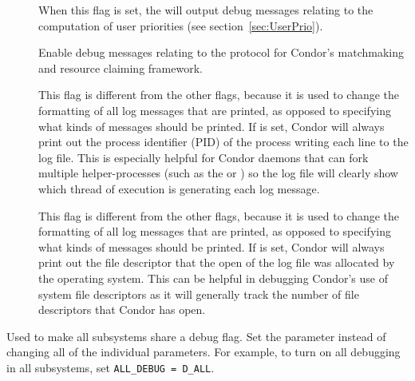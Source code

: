 \begin{description}
\begin{description}
  \item[] \label{dflag:accountant}
    When this flag is set,
    the  will output debug messages relating to the computation
    of user priorities (see section~\ref{sec:UserPrio}).

  \item[] \label{dflag:protocol}
    Enable debug messages relating to the protocol for Condor's matchmaking and
    resource claiming framework.
    
  \item[] \label{dflag:pid}
    This flag is different from the other flags, because it is
    used to change the formatting of all log messages that are printed,
    as opposed to specifying what kinds of messages should be printed.
    If  is set, Condor will always print out the process
    identifier (PID) of the process writing each line to the log file.
    This is especially helpful for Condor daemons that can fork
    multiple helper-processes (such as the  or
    ) so the log file will clearly show which thread
    of execution is generating each log message.
    
  \item[] \label{dflag:fds}
    This flag is different from the other flags, because it is
    used to change the formatting of all log messages that are printed,
    as opposed to specifying what kinds of messages should be printed.
    If  is set, Condor will always print out the file descriptor
    that the open of the log file was allocated by the operating system.
    This can be helpful in debugging Condor's use of system file
    descriptors as it will generally track the number of file descriptors
    that Condor has open.

    
  \end{description}

\item[\Macro{ALL\_DEBUG}] \label{param:AllDebug} Used to make all subsystems
  share a debug flag. Set the parameter 
  instead of changing all of the individual parameters.  For example,
  to turn on all debugging in all subsystems, set
  \verb$ALL_DEBUG = D_ALL$.


\end{description}
